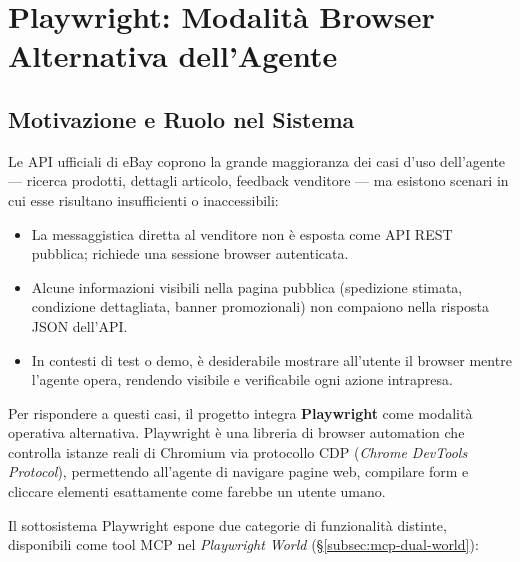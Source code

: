
\chapter{Playwright: Modalità Browser Alternativa dell'Agente}
\label{chap:playwright}

\section{Motivazione e Ruolo nel Sistema}
\label{sec:pw-intro}

Le API ufficiali di eBay coprono la grande maggioranza dei casi d'uso
dell'agente — ricerca prodotti, dettagli articolo, feedback venditore —
ma esistono scenari in cui esse risultano insufficienti o inaccessibili:

\begin{itemize}
    \item La messaggistica diretta al venditore non è esposta come API
        REST pubblica; richiede una sessione browser autenticata.
    \item Alcune informazioni visibili nella pagina pubblica (spedizione
        stimata, condizione dettagliata, banner promozionali) non
        compaiono nella risposta JSON dell'API.
    \item In contesti di test o demo, è desiderabile mostrare all'utente
        il browser mentre l'agente opera, rendendo visibile e verificabile
        ogni azione intrapresa.
\end{itemize}

Per rispondere a questi casi, il progetto integra \textbf{Playwright}
come modalità operativa alternativa. Playwright è una libreria di
browser automation che controlla istanze reali di Chromium via
protocollo CDP (\emph{Chrome DevTools Protocol}), permettendo
all'agente di navigare pagine web, compilare form e cliccare elementi
esattamente come farebbe un utente umano.

Il sottosistema Playwright espone due categorie di funzionalità distinte,
disponibili come tool MCP nel \emph{Playwright World}
(\S\ref{subsec:mcp-dual-world}):

